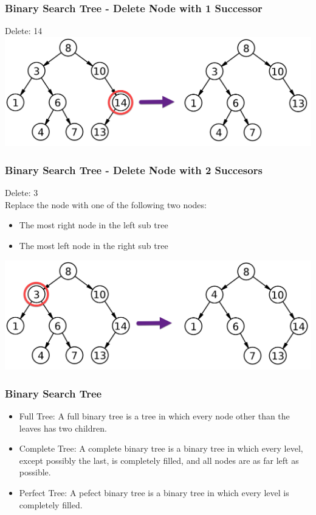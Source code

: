 \begin{frame}[fragile]
\frametitle{Binary Search Tree - Delete Node with 1 Successor}
Delete: 14\\
\vspace{3mm}
\includegraphics[scale=0.14]{img/tree3.png}
\end{frame}

\begin{frame}[fragile]
\frametitle{Binary Search Tree - Delete Node with 2 Succesors}
Delete: 3\\
Replace the node with one of the following two nodes:
\begin{itemize}
\item The most right node in the left sub tree
\item The most left node in the right sub tree
\end{itemize}
\vspace{3mm}
\includegraphics[scale=0.14]{img/tree4.png}
\end{frame}

\begin{frame}[fragile]
\frametitle{Binary Search Tree}
\begin{itemize}
\item Full Tree: A full binary tree is a tree in which every node other than the leaves has two children.
\item Complete Tree: A complete binary tree is a binary tree in which every level, except possibly the last, is completely filled, and all nodes are as far left as possible.
\item Perfect Tree: A pefect binary tree is a binary tree in which every level is completely filled.
\end{itemize}
\end{frame}

